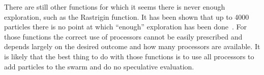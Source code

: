 \documentclass{llncs}
\begin{document}
There are still other functions for which it seems there is never enough
exploration, such as the Rastrigin function.  It has been shown that up to 4000
particles there is no point at which ``enough'' exploration has been
done~\cite{mcnabb-2009-large-particle-swarms}.  For those functions the correct
use of processors cannot be easily prescribed and depends largely on the
desired outcome and how many processors are available.  It is likely that the
best thing to do with those functions is to use all processors to add particles
to the swarm and do no speculative evaluation.



\end{document}
